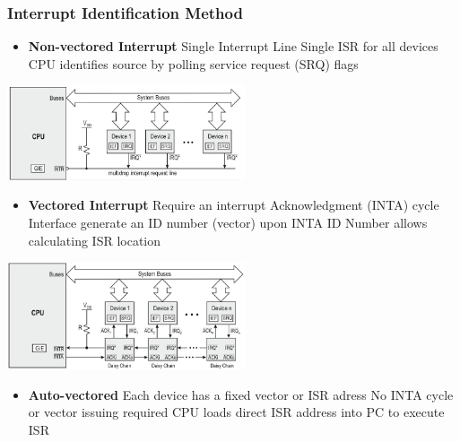 \begin{minipage}{11cm}
        \subsubsection{Interrupt Identification Method }
    \begin{itemize}
		\item \textbf{Non-vectored Interrupt}
		\subitem Single Interrupt Line
		\subitem Single \acs{ISR} for all devices
		\subitem \acs{CPU} identifies source by polling service request (\acs{SRQ}) flags
    \end{itemize}
\end{minipage}	
	\begin{minipage}{8cm}
		\hspace{0.5cm}\includegraphics[width=7cm]{images/nonvectored.png}
	\end{minipage}
	\begin{minipage}{11cm}
            \begin{itemize}
		\item \textbf{Vectored Interrupt}
		\subitem Require an interrupt Acknowledgment (\acs{INTA}) cycle
		\subitem Interface generate an ID number (vector) upon \acs{INTA}
		\subitem ID Number allows calculating \acs{ISR} location
    \end{itemize}
	\end{minipage}
		\begin{minipage}{8cm}
		\hspace{0.5cm}\includegraphics[width=7cm]{images/vectored.png}
	\end{minipage}
    \begin{itemize}
	\item \textbf{Auto-vectored}
	\subitem Each device has a fixed vector or \acs{ISR} adress
	\subitem No \acs{INTA} cycle or vector issuing required
	\subitem \acs{CPU} loads direct \acs{ISR} address into \acs{PC} to execute \acs{ISR}
\end{itemize}

